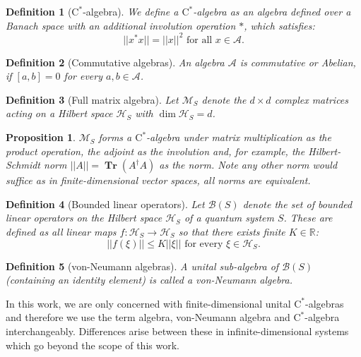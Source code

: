 \documentclass[11pt, twocolumn, floatfix, superscriptaddress, aps, prb, raggedbottom]{revtex4-2}
\newtheorem{definition}{Definition}[section]
\newtheorem{proposition}{Proposition}[section]
\newcommand{\cstar}{$\mathrm{C}^*$-algebra }
\DeclareMathOperator{\tr}{\mathbf{Tr}}
\begin{document}
\begin{definition}[$\mathrm{C}^*$-algebra]
    We define a $\mathrm{C}^*$-algebra as an algebra defined over a Banach space with an additional involution operation $*$, which satisfies:    \begin{equation}
        ||x^* x|| = ||x||^2 \text{ for all } x \in \mathcal{A}.
    \end{equation}
\end{definition}

\begin{definition}[Commutative algebras]
    An algebra $\mathcal{A}$ is commutative or Abelian, if $[a, b] = 0$ for every $a, b \in \mathcal{A}$.
\end{definition}

\begin{definition}[Full matrix algebra]
    Let $\mathcal{M}_S$ denote the $d \times d$ complex matrices acting on a Hilbert space $\mathcal{H}_S$ with $\dim \mathcal{H}_S = d$.
\end{definition}
\begin{proposition}
    $\mathcal{M}_S$ forms a \cstar under matrix multiplication as the product operation, the adjoint as the involution and, for example, the Hilbert-Schmidt norm $||A|| = \tr(A^{\dagger}A)$ as the norm. Note any other norm would suffice as in finite-dimensional vector spaces, all norms are equivalent.
\end{proposition}
\begin{definition}[Bounded linear operators]
    Let $\mathcal{B}(S)$ denote the set of bounded linear operators on the Hilbert space $\mathcal{H}_S$ of a quantum system $S$. These are defined as all linear maps $f:\mathcal{H}_S \rightarrow \mathcal{H}_S$ so that there exists finite $K\in \mathds{R}$:
    \begin{equation}
        ||f(\xi)||\le K||\xi|| \text{ for every } \xi \in \mathcal{H}_S.
    \end{equation}
\end{definition}
\begin{definition}[von-Neumann algebras]
    A unital sub-algebra of $\mathcal{B}(S)$ (containing an identity element) is called a von-Neumann algebra.
\end{definition}

In this work, we are only concerned with finite-dimensional unital $\mathrm{C}^*$-algebras and therefore we use the term algebra, von-Neumann algebra and \cstar interchangeably. Differences arise between these in infinite-dimensional systems which go beyond the scope of this work.
\end{document}
